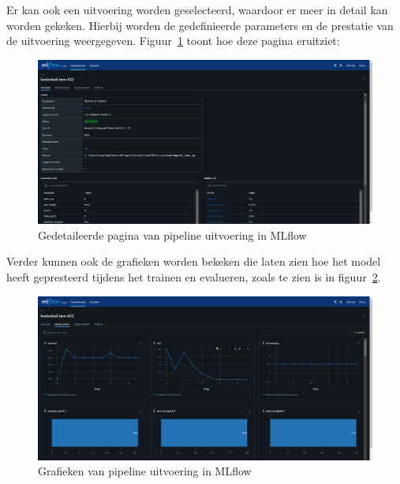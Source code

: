 Er kan ook een uitvoering worden geselecteerd, waardoor er meer in detail kan worden gekeken. Hierbij worden de gedefinieerde parameters en de prestatie van de uitvoering weergegeven. Figuur~\ref{fig:MLflow_informatie} toont hoe deze pagina eruitziet:
\begin{figure}[h]
    \centering
    \includegraphics[width=0.9\linewidth]{graphics/MLflow_Information.PNG}
    \caption{Gedetaileerde pagina van pipeline uitvoering in MLflow}
    \label{fig:MLflow_informatie}
\end{figure}
Verder kunnen ook de grafieken worden bekeken die laten zien hoe het model heeft gepresteerd tijdens het trainen en evalueren, zoals te zien is in figuur~\ref{fig:MLflow_graph}.
\begin{figure}[h]
    \centering
    \includegraphics[width=0.9\linewidth]{graphics/mlflow_Graph.PNG}
    \caption{Grafieken van pipeline uitvoering in MLflow}
    \label{fig:MLflow_graph}
\end{figure}